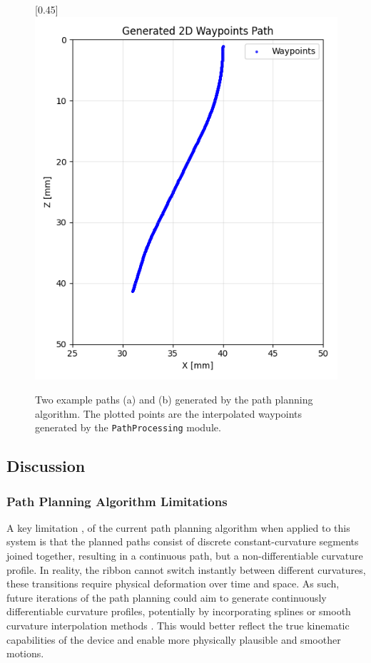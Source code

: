 \begin{figure}[H]
\begin{subcaptionbox}{\label{fig:right}}[0.45\linewidth]
        {\includegraphics[width=\linewidth]{images/waypoints/Figure_1.png}}
    \end{subcaptionbox}
    \caption{Two example paths (a) and (b) generated by the path planning algorithm. The plotted points are the interpolated waypoints generated by the \texttt{PathProcessing} module.}
    \label{fig:waypoints}
\end{figure}

\subsection{Discussion}
\subsubsection{Path Planning Algorithm Limitations}
A key limitation , of the current path planning algorithm when applied to this system is that the planned paths consist of discrete constant-curvature segments joined together, resulting in a continuous path, but a non-differentiable curvature profile. In reality, the ribbon cannot switch instantly between different curvatures, these transitions require physical deformation over time and space. 
As such, future iterations of the path planning could aim to generate continuously differentiable curvature profiles, potentially by incorporating splines or smooth curvature interpolation methods \cite{fossen_handbook_2011}. This would better reflect the true kinematic capabilities of the device and enable more physically plausible and smoother motions.


